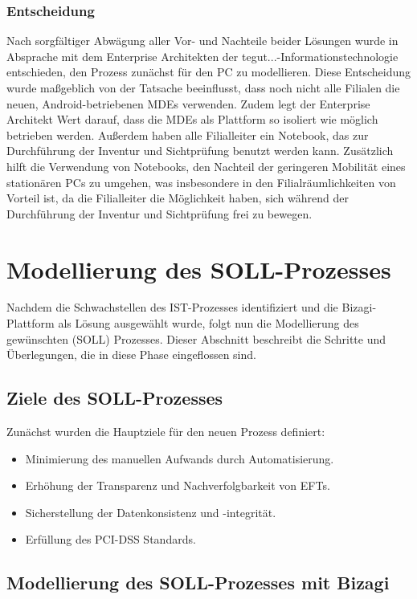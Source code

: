 \documentclass[12pt, a4paper]{article}
\begin{document}
\subsubsection{Entscheidung}
Nach sorgfältiger Abwägung aller Vor- und Nachteile beider Lösungen wurde in Absprache mit dem Enterprise Architekten der tegut...-Informationstechnologie entschieden, 
den Prozess zunächst für den PC zu modellieren. Diese Entscheidung wurde maßgeblich von der Tatsache beeinflusst, dass noch nicht alle Filialen die neuen, Android-betriebenen 
MDEs verwenden. Zudem legt der Enterprise Architekt Wert darauf, dass die MDEs als Plattform so isoliert wie möglich betrieben werden. Außerdem haben alle Filialleiter ein Notebook,
das zur Durchführung der Inventur und Sichtprüfung benutzt werden kann. Zusätzlich hilft die Verwendung von Notebooks, den Nachteil der geringeren Mobilität 
eines stationären PCs zu umgehen, was insbesondere in den Filialräumlichkeiten von Vorteil ist, da die Filialleiter die Möglichkeit haben, sich während der Durchführung 
der Inventur und Sichtprüfung frei zu bewegen.


\section{Modellierung des SOLL-Prozesses}

Nachdem die Schwachstellen des IST-Prozesses identifiziert und die Bizagi-Plattform als Lösung ausgewählt wurde, folgt nun die Modellierung des gewünschten (SOLL) Prozesses. 
Dieser Abschnitt beschreibt die Schritte und Überlegungen, die in diese Phase eingeflossen sind.

\subsection{Ziele des SOLL-Prozesses}

Zunächst wurden die Hauptziele für den neuen Prozess definiert:
\begin{itemize}
\item Minimierung des manuellen Aufwands durch Automatisierung.
\item Erhöhung der Transparenz und Nachverfolgbarkeit von EFTs.
\item Sicherstellung der Datenkonsistenz und -integrität.
\item Erfüllung des PCI-DSS Standards.
\end{itemize}


\subsection{Modellierung des SOLL-Prozesses mit Bizagi}
\end{document}
